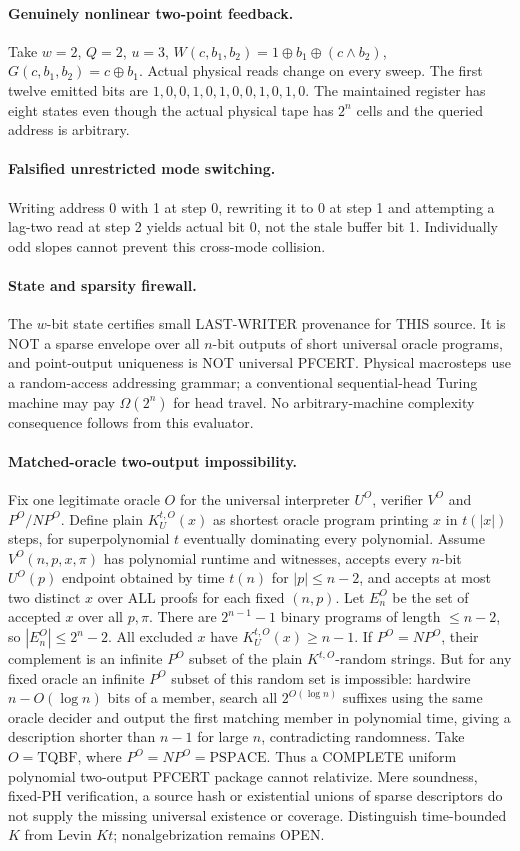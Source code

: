 \documentclass[11pt]{article}
\begin{document}
\paragraph{Genuinely nonlinear two-point feedback.} Take $w=2$, $Q=2$, $u=3$, $W(c,b_1,b_2)=1\oplus b_1\oplus(c\land b_2)$, $G(c,b_1,b_2)=c\oplus b_1$. Actual physical reads change on every sweep. The first twelve emitted bits are $1,0,0,1,0,1,0,0,1,0,1,0$. The maintained register has eight states even though the actual physical tape has $2^n$ cells and the queried address is arbitrary.
\paragraph{Falsified unrestricted mode switching.} Writing address 0 with 1 at step 0, rewriting it to 0 at step 1 and attempting a lag-two read at step 2 yields actual bit 0, not the stale buffer bit 1. Individually odd slopes cannot prevent this cross-mode collision.
\paragraph{State and sparsity firewall.} The $w$-bit state certifies small LAST-WRITER provenance for THIS source. It is NOT a sparse envelope over all $n$-bit outputs of short universal oracle programs, and point-output uniqueness is NOT universal PFCERT. Physical macrosteps use a random-access addressing grammar; a conventional sequential-head Turing machine may pay $\Omega(2^n)$ for head travel. No arbitrary-machine complexity consequence follows from this evaluator.

\paragraph{Matched-oracle two-output impossibility.}
Fix one legitimate oracle $O$ for the universal interpreter $U^O$, verifier $V^O$ and $P^O/NP^O$. Define plain $K_U^{t,O}(x)$ as shortest oracle program printing $x$ in $t(|x|)$ steps, for superpolynomial $t$ eventually dominating every polynomial. Assume $V^O(n,p,x,\pi)$ has polynomial runtime and witnesses, accepts every $n$-bit $U^O(p)$ endpoint obtained by time $t(n)$ for $|p|\le n-2$, and accepts at most two distinct $x$ over ALL proofs for each fixed $(n,p)$. Let $E_n^O$ be the set of accepted $x$ over all $p,\pi$. There are $2^{n-1}-1$ binary programs of length $\le n-2$, so $|E_n^O|\le2^n-2$. All excluded $x$ have $K_U^{t,O}(x)\ge n-1$. If $P^O=NP^O$, their complement is an infinite $P^O$ subset of the plain $K^{t,O}$-random strings. But for any fixed oracle an infinite $P^O$ subset of this random set is impossible: hardwire $n-O(\log n)$ bits of a member, search all $2^{O(\log n)}$ suffixes using the same oracle decider and output the first matching member in polynomial time, giving a description shorter than $n-1$ for large $n$, contradicting randomness. Take $O=\mathrm{TQBF}$, where $P^O=NP^O=\mathrm{PSPACE}$. Thus a COMPLETE uniform polynomial two-output PFCERT package cannot relativize. Mere soundness, fixed-PH verification, a source hash or existential unions of sparse descriptors do not supply the missing universal existence or coverage. Distinguish time-bounded $K$ from Levin $Kt$; nonalgebrization remains OPEN.
\end{document}
